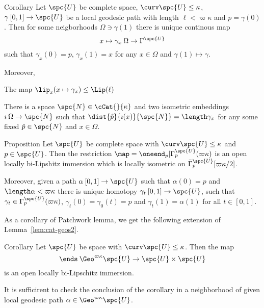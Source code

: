 \begin{thm}{Corollary}\label{cor:loc-family-one-point}
Let $\spc{U}$ be complete space,
$\curv\spc{U}\le\kappa$, 
$\gamma\:[0,1]\to\spc{U}$ be a local geodesic path with length $\ell<\varpi\kappa$
and $p=\gamma(0)$.
Then for some neigborhoods $\Omega\ni\gamma(1)$ 
there is unique continous map
$$x\mapsto\gamma_x\:\Omega\to\Gamma^\spc{U}$$
such that $\gamma_{x}(0)=p$, $\gamma_{x}(1)=x$ for any $x\in\Omega$
and $\gamma(1)\mapsto\gamma$.


Moreover, 
\begin{subthm}{}
The map $\lip_x(x\mapsto\gamma_x)\le \Lip(\ell)$
\end{subthm}



\begin{subthm}{}
There is a space $\spc{N}\in\cCat{}{\kappa}$ 
and two isometric embeddings
$\imath\:\Omega\to \spc{N}$ 
such that 
$\dist{\hat p}{\imath(x)}{\spc{N}}=\length\gamma_x$
for any some fixed $\hat p\in\spc{N}$ and $x\in \Omega$.
\end{subthm}
\end{thm}


\begin{thm}{Proposition}\label{lem:cat-geos3-cba}
Let $\spc{U}$ be complete space with $\curv\spc{U}\le\kappa$ and $p\in\spc{U}$.
Then the restriction
$\map=\oneend_p|\Gamma^\spc{U}_p(\varpi\kappa)$
is an open locally bi-Lipshitz immersion 
which is locally isometric on $\bar\Gamma^\spc{U}_p[\varpi\kappa/2]$.

Moreover, given a path $\alpha\:[0,1]\to\spc{U}$ such that
$\alpha(0)=p$ and $\length\alpha<\varpi\kappa$ there is unique homotopy $\gamma_t\:[0,1]\to\spc{U}$, such that $\gamma_t\in\Gamma^\spc{U}_p(\varpi\kappa)$,
$\gamma_t(0)=\gamma_0(t)=p$ and $\gamma_t(1)=\alpha(1)$ for all $t\in[0,1]$.
\end{thm}

As a corollary of Patchwork lemma, we get the following extension of Lemma~\ref{lem:cat-geos2}.

\begin{thm}{Corollary}\label{cor:homotopy0}
Let $\spc{U}$ be space with $\curv\spc{U}\le\kappa$.
Then the map 
$$\ends\:\Geo^{\varpi\kappa}\spc{U}\to \spc{U}\times\spc{U}$$ 
is an open locally bi-Lipschitz immersion.
\end{thm}

 It is sufficirent to check the conclusion of the corollary in a neighborhood of given local geodesic path $\alpha\in\Geo^{\varpi\kappa}\spc{U}$.

